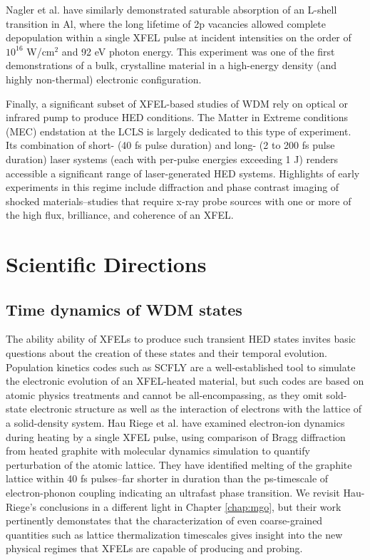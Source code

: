 \documentclass [11pt, proquest, article] {uwthesis}[2016/11/22]
\begin{document}
Nagler et al. have similarly demonstrated saturable absorption of an L-shell transition in Al, where the long lifetime of 2p vacancies allowed complete depopulation within a single XFEL pulse at incident intensities on the order of $10^{16}$ W/cm$^2$ and 92 eV photon energy.\cite{nagler2009turning} This experiment was one of the first demonstrations of a bulk, crystalline material in a high-energy density (and highly non-thermal) electronic configuration. 

Finally, a significant subset of XFEL-based studies of WDM rely on optical or infrared pump to produce HED conditions. The Matter in Extreme conditions (MEC) endstation at the LCLS is largely dedicated to this type of experiment. Its combination of short- (40 fs pulse duration) and long- (2 to 200 fs pulse duration) laser systems (each with per-pulse energies exceeding 1 J) renders accessible a significant range of laser-generated HED systems. Highlights of early experiments in this regime include diffraction and phase contrast imaging of shocked materials--studies that require x-ray probe sources with one or more of the  high flux, brilliance, and coherence of an XFEL.  


\section{Scientific Directions}
\subsection{Time dynamics of WDM states}
The ability ability of XFELs to produce such transient HED states invites basic questions about the creation of these states and their temporal evolution. Population kinetics codes such as SCFLY are a well-established tool to simulate the electronic evolution of an XFEL-heated material, but such codes are based on atomic physics treatments and cannot be all-encompassing, as they omit sold-state electronic structure as well as the interaction of electrons with the lattice of a solid-density system.  Hau Riege et al. have examined electron-ion dynamics during heating by a single XFEL pulse, using comparison of Bragg diffraction from heated graphite with molecular dynamics simulation to quantify perturbation of the atomic lattice. They have identified melting of the graphite lattice within 40 fs pulses--far shorter in duration than the ps-timescale of electron-phonon coupling indicating an ultrafast phase transition. We revisit Hau-Riege's conclusions in a different light in Chapter \ref{chap:mgo}, but their work pertinently demonstates that the characterization of even coarse-grained quantities such as lattice thermalization timescales gives insight into the new physical regimes that XFELs are capable of producing and probing. 
\end{document}
